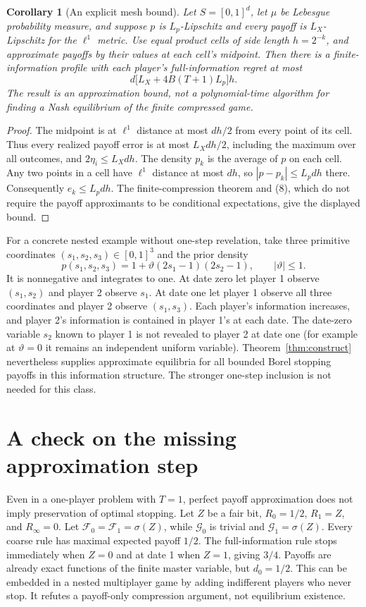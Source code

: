 \documentclass[11pt]{article}
\newtheorem{corollary}[theorem]{Corollary}
\theoremstyle{remark}\newtheorem{remark}[theorem]{Remark}
\begin{document}
\begin{corollary}[An explicit mesh bound]\label{cor:mesh}
Let $S=[0,1]^d$, let $\mu$ be Lebesgue probability measure, and suppose
$p$ is $L_p$-Lipschitz and every payoff is $L_X$-Lipschitz for the
$\ell^1$ metric. Use equal product cells of side length $h=2^{-k}$,
and approximate payoffs by their values at each cell's midpoint.
Then there is a finite-information profile with each player's
full-information regret at most
\[
 d\bigl[L_X+4B(T+1)L_p\bigr]h.
\]
The result is an approximation bound, not a polynomial-time algorithm
for finding a Nash equilibrium of the finite compressed game.
\end{corollary}
\begin{proof}
The midpoint is at $\ell^1$ distance at most $dh/2$ from every point
of its cell. Thus every realized payoff error is at most $L_Xdh/2$,
including the maximum over all outcomes, and $2\eta_i\leq L_Xdh$.
The density $p_k$ is the average of $p$ on each cell. Any two points
in a cell have $\ell^1$ distance at most $dh$, so
$|p-p_k|\leq L_pdh$ there. Consequently $e_k\leq L_pdh$.
The finite-compression theorem and (8), which do not require the payoff
approximants to be conditional expectations, give the displayed bound.
\end{proof}

For a concrete nested example without one-step revelation, take three
primitive coordinates $(s_1,s_2,s_3)\in[0,1]^3$ and the prior density
\[
 p(s_1,s_2,s_3)=1+\vartheta(2s_1-1)(2s_2-1),
 \qquad |\vartheta|\leq1.
\]
It is nonnegative and integrates to one. At date zero let player 1
observe $(s_1,s_2)$ and player 2 observe $s_1$. At date one let player 1
observe all three coordinates and player 2 observe $(s_1,s_3)$.
Each player's information increases, and player 2's information is
contained in player 1's at each date. The date-zero variable $s_2$
known to player 1 is not revealed to player 2 at date one (for example
at $\vartheta=0$ it remains an independent uniform variable).
Theorem~\ref{thm:construct} nevertheless supplies approximate equilibria
for all bounded Borel stopping payoffs in this information structure.
The stronger one-step inclusion is not needed for this class.

\section*{A check on the missing approximation step}
Even in a one-player problem with $T=1$, perfect payoff approximation does not imply preservation of optimal stopping. Let $Z$ be a fair bit, $R_0=1/2$, $R_1=Z$, and $R_\infty=0$. Let $\mathcal F_0=\mathcal F_1=\sigma(Z)$, while $\mathcal G_0$ is trivial and $\mathcal G_1=\sigma(Z)$. Every coarse rule has maximal expected payoff $1/2$. The full-information rule stops immediately when $Z=0$ and at date 1 when $Z=1$, giving $3/4$. Payoffs are already exact functions of the finite master variable, but $d_0=1/2$. This can be embedded in a nested multiplayer game by adding indifferent players who never stop. It refutes a payoff-only compression argument, not equilibrium existence.
\end{document}
